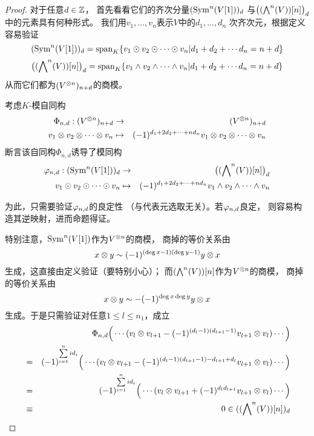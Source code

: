 \begin{proof}对于任意$d\in\mathbb{Z}$，
首先看看它们的齐次分量$(\operatorname{Sym}^n(V[1]))_d$
与$\big((\bigwedge\nolimits^{n}(V))[n]\big)_d$中的元素具有何种形式。
我们用$v_1,...,v_n$表示$V$中的$d_1,...,d_n$
次齐次元，根据定义容易验证
$$(\operatorname{Sym}^n(V[1]))_d=
\operatorname{span}_K \{v_1\odot v_2\odot\cdots\odot v_n|
d_1+d_2+\cdots d_n=n+d\}$$
$$\big((\bigwedge\nolimits^{n}(V))[n]\big)_d=
\operatorname{span}_K \{v_1\wedge v_2\wedge\cdots\wedge v_n|
d_1+d_2+\cdots d_n=n+d\}$$
从而它们都为$(V^{\otimes n})_{n+d}$的商模。

考虑$K$-模自同构
\begin{eqnarray*}
\Phi_{n,d}:(V^{\otimes n})_{n+d}&\to&(V^{\otimes n})_{n+d}\\
v_1\otimes v_2\otimes\cdots\otimes v_n
&\mapsto&(-1)^{d_1+2d_2+\cdots+nd_n}
v_1\otimes v_2\otimes\cdots\otimes v_n
\end{eqnarray*}
断言该自同构$\Phi_{n,d}$诱导了模同构
\begin{eqnarray*}
\varphi_{n,d}:(\operatorname{Sym}^n(V[1]))_d&\to&
\big((\bigwedge\nolimits^{n}(V))[n]\big)_d\\
v_1\odot v_2\odot\cdots\odot v_n
&\mapsto&(-1)^{d_1+2d_2+\cdots+nd_n}
v_1\wedge v_2\wedge\cdots\wedge v_n
\end{eqnarray*}

为此，只需要验证$\varphi_{n,d}$的良定性
（与代表元选取无关）。若$\varphi_{n,d}$良定，
则容易构造其逆映射，进而命题得证。

特别注意，$\operatorname{Sym}^n(V[1])$作为$V^{\otimes n}$的商模，
商掉的等价关系由
$$x\otimes y\sim(-1)^{(\deg x-1)(\deg y-1)}y\otimes x$$
生成，这直接由定义验证（{\color{red}要特别小心}）；
而$(\bigwedge\nolimits^{n}(V))[n]$作为$V^{\otimes n}$的商模，
商掉的等价关系由
$$x\otimes y\sim-(-1)^{\deg x\deg y}y\otimes x$$
生成。于是只需验证对任意$1\leq l\leq n_1$，成立
\begin{eqnarray*}
&&
    \Phi_{n,d}\Big(
                 \cdots( v_{l}\otimes v_{l+1}
                   -(-1)^{(d_l-1)(d_{l+1}-1)}v_{l+1}\otimes v_{l}
                 )\cdots
              \Big)\\
&=&
    (-1)^{\sum\limits_{i=1}^nid_i}
    \Big(
      \cdots(
        v_l\otimes v_{l+1}-(-1)^{(d_l-1)(d_{l+1}-1)-d_{l+1}+d_l}
        v_{l+1}\otimes v_{l}
      )\cdots
    \Big)\\
&=&
    (-1)^{\sum\limits_{i=1}^nid_i}
    \Big(
      \cdots(
        v_l\otimes v_{l+1}+(-1)^{d_ld_{l+1}}
        v_{l+1}\otimes v_{l}
      )\cdots
    \Big)\\
&\equiv& 0\in ((\bigwedge\nolimits^{n}(V))[n])_d
\end{eqnarray*}


\end{proof}


